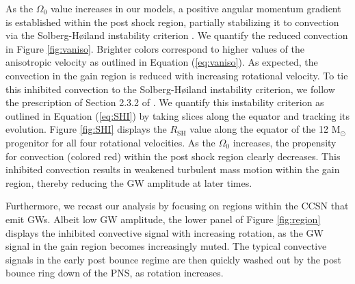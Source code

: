 \documentclass[twocolumn,times]{aastex62}  %
\newcommand{\Msun}{\ensuremath{\mathrm{M}_\odot}\xspace}
\begin{document}
  As the $\Omega_0$ value increases in our models, a positive angular momentum gradient is established within the post shock region, partially stabilizing it to convection via the Solberg-H{\o}iland instability criterion \citep{endal:1978,fryer:2000}.  We quantify the reduced convection in Figure \ref{fig:vaniso}.  Brighter colors correspond to higher values of the anisotropic velocity as outlined in Equation (\ref{eq:vaniso}).  As expected, the convection in the gain region is reduced with increasing rotational velocity.  To tie this inhibited convection to the Solberg-H{\o}iland instability criterion, we follow the prescription of Section 2.3.2 of \citet{heger:2000}.  We quantify this instability criterion as outlined in Equation (\ref{eq:SHI}) by taking slices along the equator and tracking its evolution.  Figure \ref{fig:SHI} displays the $R_{\mathrm{SH}}$ value along the equator of the 12 \Msun progenitor for all four rotational velocities.  As the $\Omega_0$ increases, the propensity for convection (colored red) within the post shock region clearly decreases.  This inhibited convection results in weakened turbulent mass motion within the gain region, thereby reducing the GW amplitude at later times.  %
 
Furthermore, we recast our analysis by focusing on regions within the CCSN that emit GWs.  Albeit low GW amplitude, the lower panel of Figure \ref{fig:region} displays the inhibited convective signal with increasing rotation, as the GW signal in the gain region becomes increasingly muted.  The typical convective signals in the early post bounce regime are then quickly washed out by the post bounce ring down of the PNS, as rotation increases.
\end{document}
